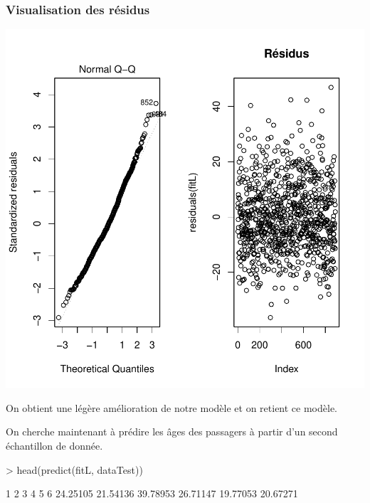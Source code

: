 \documentclass[11pt,french]{report}
\begin{document}
\subsubsection{Visualisation des résidus}
\includegraphics{notes_de_cours-044}


On obtient une légère amélioration de notre modèle et on retient ce modèle. \newline

On cherche maintenant à prédire les âges des passagers à partir d'un second échantillon de donnée.

\begin{Schunk}
\begin{Sinput}
> head(predict(fitL, dataTest))
\end{Sinput}
\begin{Soutput}
       1        2        3        4        5        6 
24.25105 21.54136 39.78953 26.71147 19.77053 20.67271 
\end{Soutput}
\end{Schunk}
\end{document}
